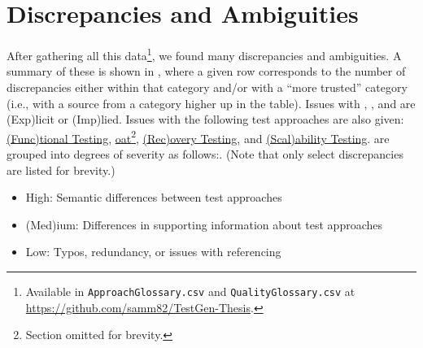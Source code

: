 \section{Discrepancies and Ambiguities}
\label{discrep}


After gathering all this data\footnote{Available in \texttt{ApproachGlossary.csv}
      and \texttt{QualityGlossary.csv} at 
      {\url{https://github.com/samm82/TestGen-Thesis}}.}, we found many discrepancies
and ambiguities. A summary of these is shown in
, where a given row corresponds to the number of
discrepancies either within that category and/or with a ``more trusted''
category (i.e., with a source from a category higher up in the table). Issues
with , , and  are
(Exp)licit or (Imp)lied. Issues with the following test approaches are also
given: \hyperref[func-test-discrep]{(Func)tional Testing},
\hyperref[oat-discrep]{\acf{oat}\ifnotpaper\else\footnote{Section omitted for
                  brevity.}\fi}, \hyperref[recov-discrep]{(Rec)overy Testing},
and \hyperref[scal-discrep]{(Scal)ability Testing}. 
are grouped into degrees of severity as follows\ifnotpaper:\else.
(Note that only select discrepancies are listed for brevity.) \fi

\begin{itemize}
      \item High: Semantic differences between test approaches
      \item (Med)ium: Differences in supporting information about test approaches
      \item Low: Typos, redundancy, or issues with referencing
\end{itemize}


